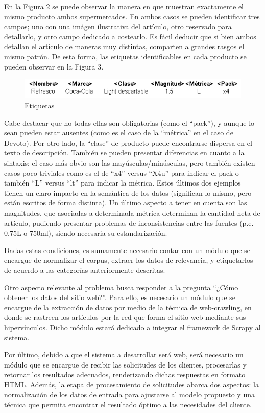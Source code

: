 \documentclass[12pt]{article} %
\begin{document}
En la Figura 2 se puede observar la manera en que muestran exactamente el mismo producto ambos supermercados. En ambos casos se pueden identificar tres campos; uno con una imágen ilustrativa del artículo, otro reservado para detallarlo, y otro campo dedicado a costearlo. Es fácil deducir que si bien ambos detallan el artículo de maneras muy distintas, comparten a grandes rasgos el mismo patrón. De esta forma, las etiquetas identificables en cada producto se pueden observar en la Figura 3.

\begin{figure}[H]
\includegraphics[height=0.07\textwidth]{etiquetas}
\centering
\caption{Etiquetas}
\end{figure}

Cabe destacar que no todas ellas son obligatorias (como el “pack”), y aunque lo sean pueden estar ausentes (como es el caso de la “métrica” en el caso de Devoto). Por otro lado, la “clase” de producto puede encontrarse dispersa en el texto de descripción. También se pueden presentar diferencias en cuanto a la sintaxis; el caso más obvio son las mayúsculas/minúsculas, pero también existen casos poco triviales como es el de “x4” versus “X4u” para indicar el pack o también “L” versus “lt” para indicar la métrica. Estos últimos dos ejemplos tienen un claro impacto en la semántica de los datos (significan lo mismo, pero están escritos de forma distinta). Un último aspecto a tener en cuenta son las magnitudes, que asociadas a determinada métrica determinan la cantidad neta de artículo, pudiendo presentar problemas de inconsistencias entre las fuentes (p.e. 0.75L o 750ml), siendo necesaria su estandarización. 

Dadas  estas condiciones, es sumamente necesario contar con un módulo que se encargue de normalizar el corpus, extraer los datos de relevancia, y etiquetarlos de acuerdo a las categorías anteriormente descritas.

Otro aspecto relevante al problema busca responder a la pregunta “¿Cómo obtener los datos del sitio web?”. Para ello, es necesario un módulo que se encargue de la extracción de datos por medio de la técnica de web-crawling, en donde se rastreen los artículos por la red que forma el sitio web mediante sus hipervínculos. Dicho módulo estará dedicado a integrar el framework de Scrapy al sistema.

Por último, debido a que el sistema a desarrollar será web, será necesario un módulo que se encargue de recibir las solicitudes de los clientes, procesarlas y retornar los resultados adecuados, renderizando dichas respuestas en formato HTML. Además, la etapa de procesamiento de solicitudes abarca dos aspectos: la normalización de los datos de entrada para ajustarse al modelo propuesto y una técnica que permita encontrar el resultado óptimo a las necesidades del cliente.
\end{document}
